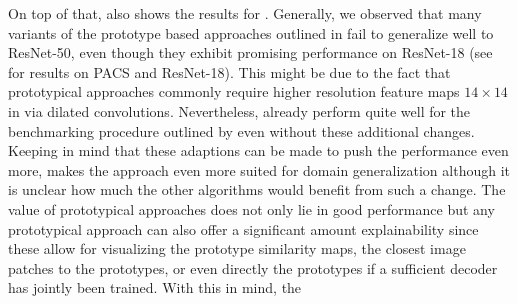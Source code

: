 On top of that,  also shows the results for \dtransformers. Generally, we observed that many variants of the prototype based approaches outlined in  fail to generalize well to ResNet-50, even though they exhibit promising performance on ResNet-18 (see  for \prodrop results on PACS and ResNet-18). This might be due to the fact that prototypical approaches commonly require higher resolution feature maps \eg $14\times14$ in \citep{DoerschGZ20} via dilated convolutions. Nevertheless, \dtransformers already perform quite well for the benchmarking procedure outlined by \domainbed even without these additional changes. Keeping in mind that these adaptions can be made to push the performance even more, makes the approach even more suited for domain generalization although it is unclear how much the other algorithms would benefit from such a change. The value of prototypical approaches does not only lie in good performance but any prototypical approach can also offer a significant amount explainability since these allow for visualizing the prototype similarity maps, the closest image patches to the prototypes, or even directly the prototypes if a sufficient decoder has jointly been trained. With this in mind, the 

